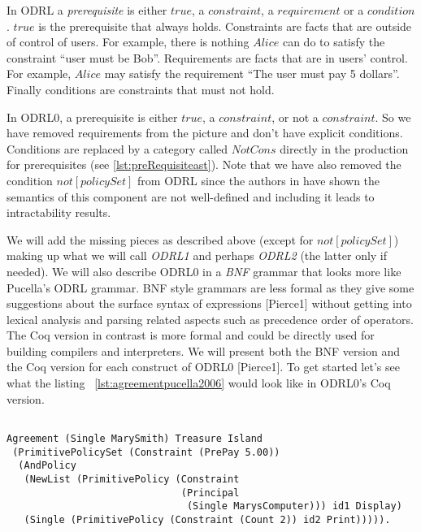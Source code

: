 In ODRL a \emph{prerequisite} is either $true$, a $constraint$, a $requirement$ or a $condition$. $true$ is the prerequisite that always holds. Constraints are facts that are outside of control of users. For example, there is nothing $Alice$ can do to satisfy the constraint ``user must be Bob''. Requirements are facts that are in users' control. For example, $Alice$ may satisfy the requirement ``The user must pay 5 dollars''. Finally conditions are constraints that must not hold.

In ODRL0, a prerequisite is either $true$, a $constraint$, or not a $constraint$. So we have removed requirements from the picture and don't have explicit conditions. Conditions are replaced by a category called $NotCons$ directly in the production for prerequisites (see \ref{lst:preRequisiteast}). Note that we have also removed the condition $not[policySet]$ from ODRL since the authors in \cite{pucella2006} have shown the semantics of this component are not well-defined and including it leads to intractability results.

We will add the missing pieces as described above (except for $not[policySet]$) making up what we will call \emph{ODRL1} and perhaps \emph{ODRL2} (the latter only if needed). We will also describe ODRL0 in a \emph{BNF} grammar that looks more like Pucella's ODRL grammar. BNF style grammars are less formal as they give some suggestions about the surface syntax of expressions [Pierce1] without getting into lexical analysis and parsing related aspects such as precedence order of operators. The Coq version in contrast is more formal and could be directly used for building compilers and interpreters. We will present both the BNF version and the Coq version for each construct of ODRL0 [Pierce1]. To get started let's see what the listing ~\ref{lst:agreementpucella2006} would look like in ODRL0's Coq version.

\lstset{language=Coq}
\begin{lstlisting}[frame=single, caption={Coq version of agreement for Mary Smith},label={lst:marysmithagreementcoq}]

Agreement (Single MarySmith) Treasure Island 
 (PrimitivePolicySet (Constraint (PrePay 5.00))
  (AndPolicy 
   (NewList (PrimitivePolicy (Constraint 
                              (Principal 
                               (Single MarysComputer))) id1 Display)
   (Single (PrimitivePolicy (Constraint (Count 2)) id2 Print))))).
\end{lstlisting}



